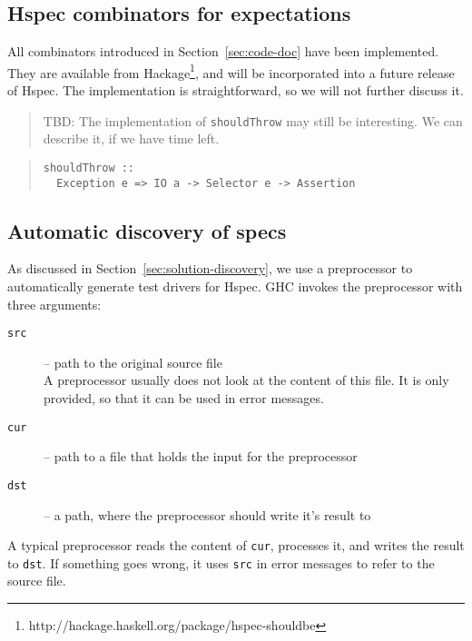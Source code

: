 \documentclass[preprint]{sigplanconf}
\begin{document}

\subsection{Hspec combinators for expectations}
\label{sec:hspec-comb}

\noindent All combinators introduced in Section~\ref{sec:code-doc} have been
implemented.  They are available from Hackage\footnote{%
http://hackage.haskell.org/package/hspec-shouldbe},
and will be incorporated into a future
release of Hspec.
The implementation is straightforward, so we will not further discuss
it.

\begin{quote}
    TBD: The implementation of \verb|shouldThrow| may still be
    interesting.  We can describe it, if we have time left.
\end{quote}

\begin{quote}
\small
\begin{verbatim}
shouldThrow ::
  Exception e => IO a -> Selector e -> Assertion
\end{verbatim}
\end{quote}

\subsection{Automatic discovery of specs}
\label{sec:implementation-discovery}

As discussed in Section~\ref{sec:solution-discovery}, we use a preprocessor to
automatically generate test drivers for Hspec.  GHC invokes the
preprocessor with three arguments:

\begin{description}
    \item[{\tt src}]
        -- path to the original source file\\
        A preprocessor usually does not
        look at the content of this file.  It is only provided, so
        that it can be used in error messages.
    \item[{\tt cur}]
        -- path to a file that holds the input for the preprocessor
    \item[{\tt dst}]
        -- a path, where the preprocessor should write it's result to
\end{description}


\noindent A typical preprocessor reads the content of {\tt cur},
processes it, and writes the result to {\tt dst}.  If something goes
wrong, it uses {\tt src} in error messages to refer to the source
file.
\end{document}
